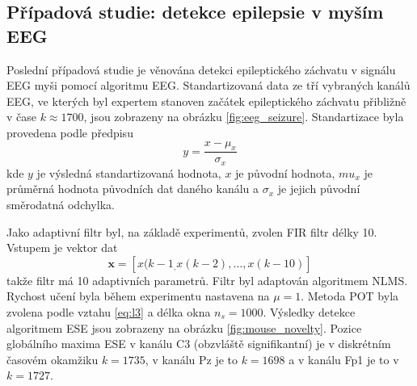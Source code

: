 \subsection{Případová studie: detekce epilepsie v myším EEG}
Poslední případová studie je věnována detekci epileptického záchvatu v signálu EEG myši pomocí algoritmu EEG. Standartizovaná data ze tří vybraných kanálů EEG, ve kterých byl expertem stanoven začátek epileptického záchvatu přibližně v čase $k \approx 1700$, jsou zobrazeny na obrázku \ref{fig:eeg_seizure}. Standartizace byla provedena podle předpisu
\begin{equation}
y=\frac{x-\mu_{x}}{\sigma_{x}}
\end{equation}
kde $y$ je výsledná standartizovaná hodnota, $x$ je původní hodnota, $mu_x$ je průměrná hodnota původních dat daného kanálu a $\sigma_x$ je jejich původní směrodatná odchylka.
\par
Jako adaptivní filtr byl, na základě experimentů, zvolen FIR filtr délky 10. Vstupem je vektor dat
\begin{equation}
\textbf{x}=[x(k-1_,x(k-2),\dots,x(k-10)]
\end{equation}
takže filtr má 10 adaptivních parametrů. Filtr byl adaptován algoritmem NLMS. Rychost učení byla během experimentu nastavena na $\mu=1$. Metoda POT byla zvolena podle vztahu \ref{eq:l3} a délka okna $n_s=1000$. Výsledky detekce algoritmem ESE jsou zobrazeny na obrázku \ref{fig:mouse_novelty}. Pozice globálního maxima ESE v kanálu C3 (obzvláště signifikantní) je v diskrétním časovém okamžiku $k=1735$, v kanálu Pz je to  $k=1698$ a v kanálu Fp1 je to v $k=1727$. 

